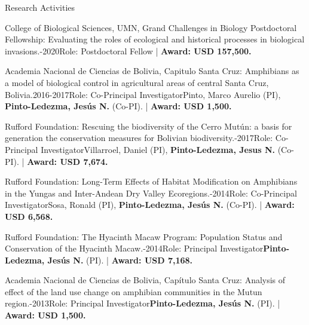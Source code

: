 \documentclass{resume} %
\begin{document}
\begin{rSection}{Research Activities}
\begin{pSubsection}{College of Biological Sciences, UMN, Grand Challenges in Biology Postdoctoral Fellowship: }{\normalfont Evaluating the roles of ecological and historical processes in biological invasions.}{-2020}{\normalfont Role: Postdoctoral Fellow}{ | {\bf Award: USD 157,500.}}
\end{pSubsection}

\begin{pSubsection}{Academia Nacional de Ciencias de Bolivia, Capitulo Santa Cruz: }{\normalfont Amphibians as a model of biological control in agricultural areas of central Santa Cruz, Bolivia.}{2016-2017}{\normalfont Role: Co-Principal Investigator}{\normalfont Pinto, Marco Aurelio (PI), \textbf{Pinto-Ledezma, Jesús N.} (Co-PI). | {\bf Award: USD 1,500.}}
\end{pSubsection}

\begin{pSubsection}{Rufford Foundation: }{\normalfont Rescuing the biodiversity of the Cerro Mutún: a basis for generation the conservation measures for Bolivian biodiversity.}{-2017}{\normalfont Role: Co-Principal Investigator}{\normalfont Villarroel, Daniel (PI), \textbf{Pinto-Ledezma, Jesus N.} (Co-PI). | {\bf Award: USD 7,674.}}
\end{pSubsection}

\begin{pSubsection}{Rufford Foundation: }{\normalfont Long-Term Effects of Habitat Modification on Amphibians in the Yungas and Inter-Andean Dry Valley Ecoregions.}{-2014}{\normalfont Role: Co-Principal Investigator}{\normalfont Sosa, Ronald (PI), \textbf{Pinto-Ledezma, Jesús N.} (Co-PI). | {\bf Award: USD 6,568.}}
\end{pSubsection}

\begin{pSubsection}{Rufford Foundation: }{\normalfont The Hyacinth Macaw Program: Population Status and Conservation of the Hyacinth Macaw.}{-2014}{\normalfont Role: Principal Investigator}{\textbf{Pinto-Ledezma, Jesús N.} \normalfont (PI). | {\bf Award: USD 7,168.}}
\end{pSubsection}

\begin{pSubsection}{Academia Nacional de Ciencias de Bolivia, Capítulo Santa Cruz: }{\normalfont Analysis of effect of the land use change on amphibian communities in the Mutun region.}{-2013}{\normalfont Role: Principal Investigator}{\textbf{Pinto-Ledezma, Jesús N.} \normalfont (PI). | {\bf Award: USD 1,500.}}
\end{pSubsection}


\end{rSection}
\end{document}
